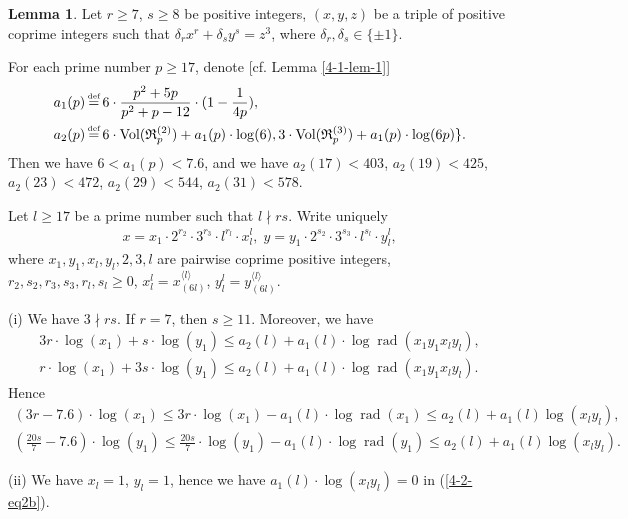 \documentclass[a4paper, 12pt]{article}
\DeclareMathOperator{\defeq}{\overset{\text{\tiny{def}}}{=}}
\DeclareMathOperator{\rad}{\text{rad}}
\DeclareMathOperator{\Vol}{\text{Vol}}
\newcommand{\lagl}{\langle l \rangle}
\numberwithin{equation}{section}
\theoremstyle{definition}
\newtheorem{lem}[thm]{Lemma}
\begin{document}
\begin{lem}  \label{4-2-lem-1}
Let $r \ge 7$, $s\ge 8$ be positive integers, $(x,y,z)$ be a triple of positive coprime integers such that $\delta_r x^r + \delta_s y^s = z^3$, where $\delta_r,\delta_s \in \{\pm 1\}$. 

For each prime number $p\ge 17$, denote [cf. Lemma \ref{4-1-lem-1}]
\small\begin{align*}
a_1(p) &\defeq 6 \cdot \frac{p^2+5p}{p^2+p-12}\cdot (1-\frac{1}{4p}),  \\
a_2(p) &\defeq 6 \cdot \Vol(\mathfrak R_p^{(2)})  + a_1(p)\cdot \log(6), 3 \cdot \Vol(\mathfrak R_p^{(3)}) + a_1(p)\cdot \log(6p) \} .
\end{align*}\normalsize
Then we have $6 < a_1(p) < 7.6$, and we have 
$a_2(17) < 403$, $a_2(19) < 425$, $a_2(23) < 472$, 
$a_2(29) < 544$, $a_2(31) < 578$.

Let $l\ge 17$ be a prime number such that $l\nmid rs$.
Write uniquely \small\begin{gather}  \label{4-2-eq1}
x = x_1 \cdot 2^{r_2} \cdot 3^{r_3} \cdot l^{r_l} \cdot x_l^{l}, \;
y = y_1 \cdot 2^{s_2} \cdot 3^{s_3} \cdot l^{s_l} \cdot y_l^{l},
\end{gather}\normalsize
where $x_1, y_1, x_l, y_l, 2, 3, l$ are pairwise coprime positive integers, $r_2, s_2, r_3, s_3, r_l, s_l \ge 0$, $x_l^l = x_{(6l)}^{\lagl}$, $y_l^l = y_{(6l)}^{\lagl}$.

(i) We have $3\nmid rs$. If $r = 7$, then $s \ge 11$. 
Moreover, we have
\begin{equation}\label{4-2-eq2}
\begin{aligned}
3r \cdot \log(x_1) + s \cdot \log(y_1) \le a_2(l) + a_1(l)\cdot \log\rad(x_1 y_1 x_l y_l), \\
r \cdot \log(x_1) + 3s \cdot \log(y_1) \le a_2(l) + a_1(l)\cdot \log\rad(x_1 y_1 x_l y_l).
\end{aligned}
\end{equation}
Hence 
{\small
\begin{equation}\label{4-2-eq2b}
\begin{aligned}
(3r-7.6) \cdot \log(x_1) \le 3r \cdot \log(x_1) - a_1(l) \cdot \log\rad(x_1) \le a_2(l) +  a_1(l) \log(x_l y_l),  \\
(\frac{20s}{7}-7.6) \cdot \log(y_1) \le \frac{20s}{7}\cdot \log(y_1) - a_1(l) \cdot \log\rad(y_1) \le a_2(l) +  a_1(l) \log(x_l y_l).
\end{aligned}
\end{equation} }

(ii) We have $x_l = 1$, $y_l = 1$, hence we have  $a_1(l) \cdot \log(x_l y_l) = 0$ in (\ref{4-2-eq2b}).


\end{lem}
\end{document}
